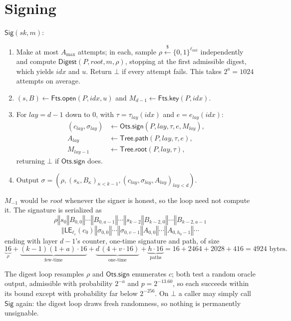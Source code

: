 \documentclass[11pt]{article}
\theoremstyle{definition}
\theoremstyle{plain}
\theoremstyle{remark}
\newcommand{\bits}[1]{\{0,1\}^{#1}}
\newcommand{\getsr}{\stackrel{\$}{\gets}}
\newcommand{\Digest}{\mathsf{Digest}}
\newcommand{\Sig}{\mathsf{Sig}}
\newcommand{\LE}{\mathsf{LE}}
\newcommand{\concat}{\mathbin\Vert}
\newcommand{\sk}{\mathit{sk}}
\newcommand{\rootnode}{\mathit{root}}
\newcommand{\lrnd}{\ell_{\mathrm{rnd}}}
\newcommand{\lctr}{\ell_{\mathrm{c}}}
\newcommand{\amax}{A_{\max}}
\newcommand{\idx}{\mathit{idx}}
\newcommand{\lay}{\mathit{lay}}
\newcommand{\OtsSign}{\mathsf{Ots.sign}}
\newcommand{\TreeRoot}{\mathsf{Tree.root}}
\newcommand{\TreePath}{\mathsf{Tree.path}}
\newcommand{\FtsKey}{\mathsf{Fts.key}}
\newcommand{\FtsOpen}{\mathsf{Fts.open}}
\begin{document}
\section{Signing}
\label{sec:sign}

$\Sig(\sk,m)$:
\begin{enumerate}[leftmargin=2em]
\item Make at most $\amax$ attempts; in each, sample $\rho\getsr\bits{\lrnd}$ independently and compute $\Digest(P,\rootnode,m,\rho)$, stopping at the first admissible digest, which yields $\idx$ and $u$. Return $\bot$ if every attempt fails. This takes $2^a=1024$ attempts on average.
\item $(s,B)\gets\FtsOpen(P,\idx,u)$ and $M_{d-1}\gets\FtsKey(P,\idx)$.
\item For $\lay=d-1$ down to $0$, with $\tau=\tau_\lay(\idx)$ and $e=e_\lay(\idx)$:
\[
\begin{aligned}
  (c_\lay,\sigma_\lay)&\gets\OtsSign(P,\lay,\tau,e,M_\lay),\\
  A_\lay&\gets\TreePath(P,\lay,\tau,e),\\
  M_{\lay-1}&\gets\TreeRoot(P,\lay,\tau),
\end{aligned}
\]
returning $\bot$ if $\OtsSign$ does.
\item Output $\sigma=\left(\rho,(s_\kappa,B_\kappa)_{\kappa<k-1},(c_\lay,\sigma_\lay,A_\lay)_{\lay<d}\right)$.
\end{enumerate}
$M_{-1}$ would be $\rootnode$ whenever the signer is honest, so the loop need not compute it. The signature is serialized as
\[
  \rho
  \concat s_0\concat B_{0,0}\concat\cdots\concat B_{0,a-1}
  \concat\cdots
  \concat s_{k-2}\concat B_{k-2,0}\concat\cdots\concat B_{k-2,a-1}
\]
\[
  \concat\LE_{\lctr}(c_0)\concat\sigma_{0,0}\concat\cdots\concat\sigma_{0,v-1}\concat A_{0,0}\concat\cdots\concat A_{0,h_0-1}
  \concat\cdots
\]
ending with layer $d-1$'s counter, one-time signature and path, of size
\[
  \underbrace{16}_{\rho}+\underbrace{(k-1)(1+a)\cdot 16}_{\text{few-time}}+\underbrace{d\,(4+v\cdot 16)}_{\text{one-time}}+\underbrace{h\cdot 16}_{\text{paths}}
  =16+2464+2028+416=4924\text{ bytes.}
\]

The digest loop resamples $\rho$ and $\OtsSign$ enumerates $c$; both test a random oracle output, admissible with probability $2^{-a}$ and $p=2^{-13.60}$, so each succeeds within its bound except with probability far below $2^{-256}$. On $\bot$ a caller may simply call $\Sig$ again: the digest loop draws fresh randomness, so nothing is permanently unsignable.
\end{document}
